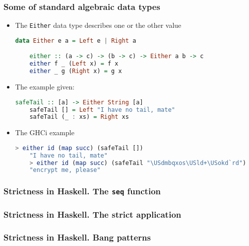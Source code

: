 \documentclass[10pt,pdf,utf8,russian,aspectratio=169]{beamer}
\begin{document}
\begin{frame}[fragile]
  \frametitle{Some of standard algebraic data types}
  \begin{itemize}
    \item The \verb"Either" data type describes one or the other value

    \begin{lstlisting}[language=Haskell]
    data Either e a = Left e | Right a

    either :: (a -> c) -> (b -> c) -> Either a b -> c
    either f _ (Left x) = f x
    either _ g (Right x) = g x
    \end{lstlisting}
    \item The example given:
    \begin{lstlisting}[language=Haskell]
    safeTail :: [a] -> Either String [a]
    safeTail [] = Left "I have no tail, mate"
    safeTail (_ : xs) = Right xs
    \end{lstlisting}
    \item The GHCi example
    \begin{lstlisting}[language=Haskell]
    > either id (map succ) (safeTail [])
    "I have no tail, mate"
    > either id (map succ) (safeTail "\USdmbqxos\USld+\USokd`rd")
    "encrypt me, please"
    \end{lstlisting}
  \end{itemize}
\end{frame}

\begin{frame}
  \frametitle{}
\end{frame}

\begin{frame}
  \frametitle{Strictness in Haskell. The \verb"seq" function}
\end{frame}

\begin{frame}
  \frametitle{Strictness in Haskell. The strict application}
\end{frame}

\begin{frame}
  \frametitle{Strictness in Haskell. Bang patterns}
\end{frame}
\end{document}
